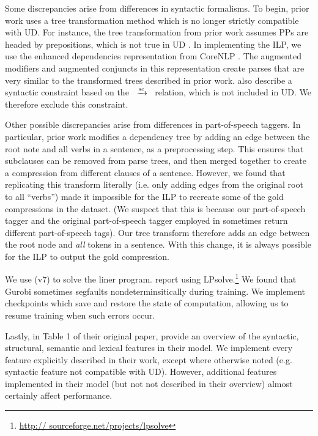 \documentclass[11pt,a4paper]{article}
\newcommand{\rdep}[1]{\ $\xrightarrow{\text{\tiny #1}}$\ }
\begin{document}
Some discrepancies arise from differences in syntactic formalisms. To begin, prior work uses a tree transformation method which is no longer strictly compatible with UD. For instance, the tree transformation from prior work assumes PPs are headed by prepositions, which is not true in UD \cite{Schuster2016EnhancedEU}. In implementing the ILP, we use the enhanced dependencies representation from CoreNLP \cite{Schuster2016EnhancedEU}. The augmented modifiers and augmented conjuncts in this representation create parses that are very similar to the transformed trees described in prior work. \citet{filippova2008dependency} also describe a syntactic constraint based on the \rdep{sc} relation, which is not included in UD. We therefore exclude this constraint.

Other possible discrepancies arise from differences in part-of-speech taggers. In particular, prior work modifies a dependency tree by adding an edge between the root note and all verbs in a sentence, as a preprocessing step. This ensures that subclauses can be removed from parse trees, and then merged together to create a compression from different clauses of a sentence. However, we found that replicating this transform literally (i.e. only adding edges from the original root to all ``verbs'') made it impossible for the ILP to recreate some of the gold compressions in the dataset. (We suspect that this is because our part-of-speech tagger and the original part-of-speech tagger employed in \citet{filippova2013overcoming} sometimes return different part-of-speech tags). Our tree transform therefore adds an edge between the root node and \textit{all} tokens in a sentence. With this change, it is always possible for the ILP to output the gold compression.

We use \citet{gurobi} (v7) to solve the liner program. \citet{filippova2008dependency} report using LPsolve.\footnote{\url{http://
sourceforge.net/projects/lpsolve}}  We found that Gurobi sometimes segfaults nondeterminsitically during training. We implement checkpoints which save and restore the state of computation, allowing us to resume training when such errors occur. 

Lastly, in Table 1 of their original paper, \citet{filippova2013overcoming} provide an overview of the syntactic, structural, semantic and lexical features in their model. We implement every feature explicitly described in their work, except where otherwise noted (e.g. syntactic feature not compatible with UD). However, additional features implemented in their model (but not not described in their overview) almost certainly affect performance. 
\end{document}
